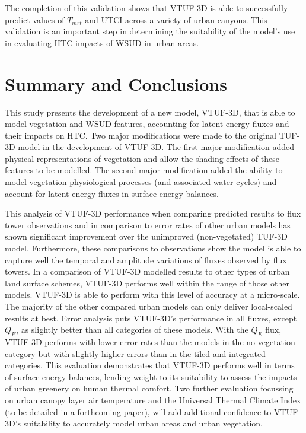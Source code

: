 \documentclass[final,3p,times,authoryear]{elsarticle}
\begin{document}
The completion of this validation shows that VTUF-3D is able to successfully predict values of $T_{mrt}$ and UTCI across a variety of urban canyons. This validation is an important step in determining the suitability of the model's use in evaluating HTC impacts of WSUD in urban areas.




\section{Summary and Conclusions}

This study presents the development of a new model, VTUF-3D, that is able to model vegetation and WSUD features, accounting for latent energy fluxes and their impacts on HTC. Two major modifications were made to the original TUF-3D model in the development of VTUF-3D. The first major modification added physical representations of vegetation and allow the shading effects of these features to be modelled. The second major modification added the ability to model vegetation physiological processes (and associated water cycles) and account for latent energy fluxes in surface energy balances.

This analysis of VTUF-3D performance when comparing predicted results to flux tower observations and in comparison to error rates of other urban models has shown significant improvement over the unimproved (non-vegetated) TUF-3D model. Furthermore, these comparisons to observations show the model is able to capture well the temporal and amplitude variations of fluxes observed by flux towers. In a comparison of VTUF-3D modelled results to other types of urban land surface schemes, VTUF-3D performs well within the range of those other models. VTUF-3D is able to perform with this level of accuracy at a micro-scale. The majority of the other compared urban models can only deliver local-scaled results at best. Error analysis puts VTUF-3D's performance in all fluxes, except $Q_{E}$, as slightly better than all categories of these models. With the $Q_{E}$ flux, VTUF-3D performs with lower error rates than the models in the no vegetation category but with slightly higher errors than in the tiled and integrated categories. This evaluation demonstrates that VTUF-3D performs well in terms of surface energy balances, lending weight to its suitability to assess the impacts of urban greenery on human thermal comfort. Two further evaluation focussing on urban canopy layer air temperature and the Universal Thermal Climate Index (to be detailed in a forthcoming paper), will add additional confidence to VTUF-3D's suitability to accurately model urban areas and urban vegetation.
\end{document}
